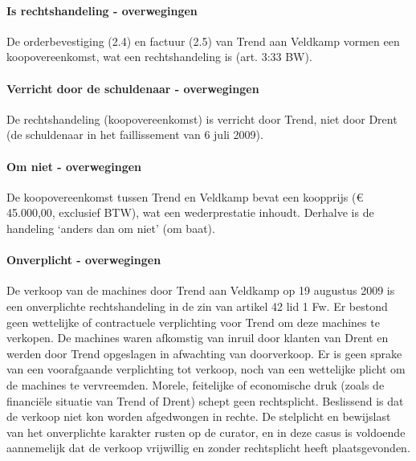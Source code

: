 \documentclass[
  dutch,
  a4paper,
]{article}
\begin{document}
\paragraph{Is rechtshandeling - overwegingen}\label{is-rechtshandeling---overwegingen-69}

De orderbevestiging (2.4) en factuur (2.5) van Trend aan Veldkamp vormen een koopovereenkomst, wat een rechtshandeling is (art. 3:33 BW).

\paragraph{Verricht door de schuldenaar - overwegingen}\label{verricht-door-de-schuldenaar---overwegingen-69}

De rechtshandeling (koopovereenkomst) is verricht door Trend, niet door Drent (de schuldenaar in het faillissement van 6 juli 2009).

\paragraph{Om niet - overwegingen}\label{om-niet---overwegingen-69}

De koopovereenkomst tussen Trend en Veldkamp bevat een koopprijs (€ 45.000,00, exclusief BTW), wat een wederprestatie inhoudt. Derhalve is de handeling `anders dan om niet' (om baat).

\paragraph{Onverplicht - overwegingen}\label{onverplicht---overwegingen-69}

De verkoop van de machines door Trend aan Veldkamp op 19 augustus 2009 is een onverplichte rechtshandeling in de zin van artikel 42 lid 1 Fw. Er bestond geen wettelijke of contractuele verplichting voor Trend om deze machines te verkopen. De machines waren afkomstig van inruil door klanten van Drent en werden door Trend opgeslagen in afwachting van doorverkoop. Er is geen sprake van een voorafgaande verplichting tot verkoop, noch van een wettelijke plicht om de machines te vervreemden. Morele, feitelijke of economische druk (zoals de financiële situatie van Trend of Drent) schept geen rechtsplicht. Beslissend is dat de verkoop niet kon worden afgedwongen in rechte. De stelplicht en bewijslast van het onverplichte karakter rusten op de curator, en in deze casus is voldoende aannemelijk dat de verkoop vrijwillig en zonder rechtsplicht heeft plaatsgevonden.
\end{document}
